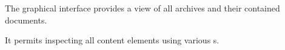 The graphical interface provides a view of all archives and their contained documents.

It permits inspecting all content elements using various s.